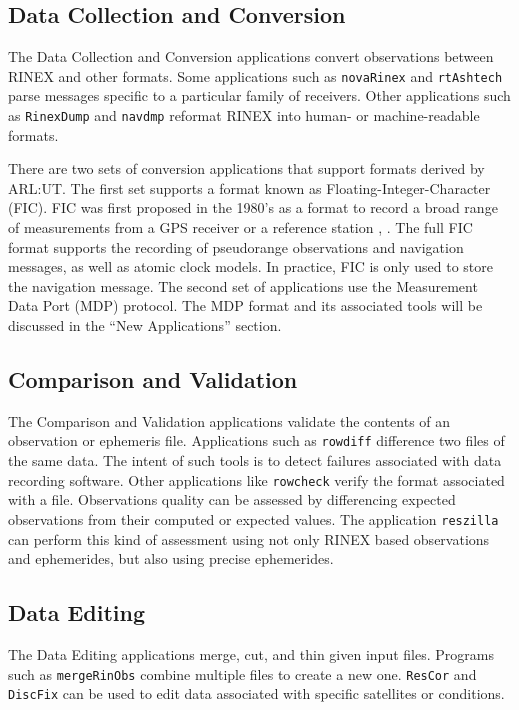 \documentclass{ion-gps}
\newcommand{\gpstkapplication}[1]{\texttt{#1}}
\begin{document}
\subsection*{Data Collection and Conversion}

The Data Collection and Conversion applications convert 
observations between RINEX and other formats. Some applications 
such as \gpstkapplication{novaRinex}
and \gpstkapplication{rtAshtech} parse messages specific to a
particular family of receivers. Other applications such as
\gpstkapplication{RinexDump} and \gpstkapplication{navdmp}
reformat RINEX into human- or machine-readable formats.

There are two sets of conversion applications that support formats
derived by ARL:UT.  The first set supports a format known as
Floating-Integer-Character (FIC). FIC was first proposed in the 1980's
as a format to record a broad range of measurements from a GPS receiver or
a reference station \cite{rinex1format}, \cite{ficproposal}. The full
FIC format supports the recording of pseudorange observations and
navigation messages, as well as atomic clock models. In practice, FIC is only used to store the
navigation message. The second set of applications use
the Measurement Data Port (MDP) protocol. The MDP format and its
associated tools will be discussed in the ``New
Applications'' section.

\subsection*{Comparison and Validation}
The Comparison and Validation applications validate the contents of an observation or 
ephemeris file. Applications such as \gpstkapplication{rowdiff} 
difference two files of the same data. The intent of such tools 
is to detect failures associated with data recording software. 
Other applications like \gpstkapplication{rowcheck} verify the 
format associated with a file. Observations quality can be assessed 
by differencing expected observations from their computed or expected 
values. The application \gpstkapplication{reszilla} can perform 
this kind of assessment using not only RINEX based observations and 
ephemerides, but also using precise ephemerides. 

\subsection*{Data Editing}
The Data Editing applications merge, cut, and thin given input 
files. Programs such as \gpstkapplication{mergeRinObs} combine 
multiple files to create a new one. \gpstkapplication{ResCor} 
and \gpstkapplication{DiscFix} can be used to edit data associated 
with specific satellites or conditions.
\end{document}
